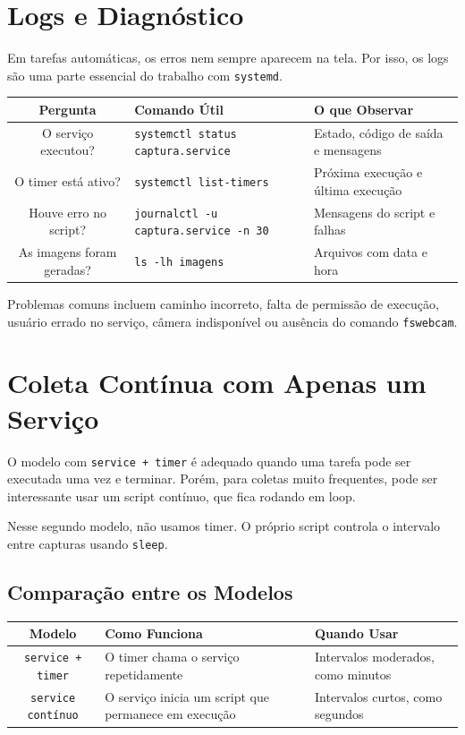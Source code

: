\documentclass[12pt]{article}
\begin{document}
\section{Logs e Diagnóstico}

Em tarefas automáticas, os erros nem sempre aparecem na tela. Por isso, os logs são uma parte essencial do trabalho com \texttt{systemd}.

\begin{cmdbox}
\begin{tabularx}{\linewidth}{@{}C >{\raggedright\arraybackslash}X >{\raggedright\arraybackslash}X@{}}
\toprule
\textbf{Pergunta} & \textbf{Comando Útil} & \textbf{O que Observar} \\
\midrule
O serviço executou? & \texttt{systemctl status captura.service} & Estado, código de saída e mensagens \\
O timer está ativo? & \texttt{systemctl list-timers} & Próxima execução e última execução \\
Houve erro no script? & \texttt{journalctl -u captura.service -n 30} & Mensagens do script e falhas \\
As imagens foram geradas? & \texttt{ls -lh imagens} & Arquivos com data e hora \\
\bottomrule
\end{tabularx}
\end{cmdbox}

Problemas comuns incluem caminho incorreto, falta de permissão de execução, usuário errado no serviço, câmera indisponível ou ausência do comando \texttt{fswebcam}.

\section{Coleta Contínua com Apenas um Serviço}

O modelo com \texttt{service + timer} é adequado quando uma tarefa pode ser executada uma vez e terminar. Porém, para coletas muito frequentes, pode ser interessante usar um script contínuo, que fica rodando em loop.

Nesse segundo modelo, não usamos timer. O próprio script controla o intervalo entre capturas usando \texttt{sleep}.

\subsection{Comparação entre os Modelos}

\begin{cmdbox}
\begin{tabularx}{\linewidth}{@{}C >{\raggedright\arraybackslash}X >{\raggedright\arraybackslash}X@{}}
\toprule
\textbf{Modelo} & \textbf{Como Funciona} & \textbf{Quando Usar} \\
\midrule
\texttt{service + timer} & O timer chama o serviço repetidamente & Intervalos moderados, como minutos \\
\texttt{service contínuo} & O serviço inicia um script que permanece em execução & Intervalos curtos, como segundos \\
\bottomrule
\end{tabularx}
\end{cmdbox}
\end{document}
